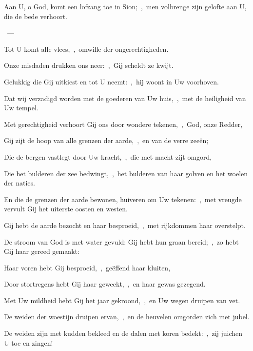 \documentclass[12pt,twoside,a5paper]{article}
\begin{document}
\begin{halfparskip}
   Aan U, o God, komt een lofzang toe in Sion;~\sep\ men volbrenge zijn gelofte aan U, die de bede verhoort.

  ~--- 

  Tot U komt alle vlees,~\sep\ omwille der ongerechtigheden.

  Onze misdaden drukken ons neer:~\sep\ Gij scheldt ze kwijt.

  Gelukkig die Gij uitkiest en tot U neemt:~\sep\ hij woont in Uw voorhoven.

  Dat wij verzadigd worden met de goederen van Uw huis,~\sep\ met de heiligheid van Uw tempel.

  Met gerechtigheid verhoort Gij ons door wondere tekenen,~\sep\ God, onze Redder,

  Gij zijt de hoop van alle grenzen der aarde,~\sep\ en van de verre zeeën;

  Die de bergen vastlegt door Uw kracht,~\sep\ die met macht zijt omgord,

  Die het bulderen der zee bedwingt,~\sep\ het bulderen van haar golven en het woelen der naties.

  En die de grenzen der aarde bewonen, huiveren om Uw tekenen:~\sep\ met vreugde vervult Gij het uiterste oosten en westen.

  Gij hebt de aarde bezocht en haar besproeid,~\sep\ met rijkdommen haar overstelpt.

  De stroom van God is met water gevuld: Gij hebt hun graan bereid;~\sep\ zo hebt Gij haar gereed gemaakt:

  Haar voren hebt Gij besproeid,~\sep\ geëffend haar kluiten,

  Door stortregens hebt Gij haar geweekt,~\sep\ en haar gewas gezegend.

  Met Uw mildheid hebt Gij het jaar gekroond,~\sep\ en Uw wegen druipen van vet.

  De weiden der woestijn druipen ervan,~\sep\ en de heuvelen omgorden zich met jubel.

  De weiden zijn met kudden bekleed en de dalen met koren bedekt:~\sep\ zij juichen U toe en zingen!
\end{halfparskip}
\end{document}
